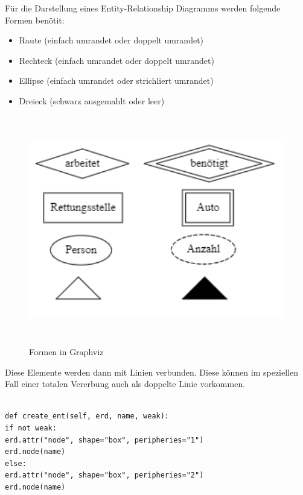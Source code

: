 \noindent
Für die Darstellung eines Entity-Relationship Diagramms werden folgende Formen benötit:
\begin{itemize}
	\item Raute (einfach umrandet oder doppelt umrandet)
	\item Rechteck (einfach umrandet oder doppelt umrandet)
	\item Ellipse (einfach umrandet oder strichliert umrandet)
	\item Dreieck (schwarz ausgemahlt oder leer)
\end{itemize}


\begin{figure}[H]
	\begin{center}
		\includegraphics[width=16cm,height=10cm]{images/graphviz_formen.png}
		\caption{Formen in Graphviz}
		\label{dot}
	\end{center}
\end{figure}
\fib{}
\noindent
Diese Elemente werden dann mit Linien verbunden. Diese können im speziellen Fall einer totalen Vererbung auch als doppelte Linie vorkommen.
\lstset{language=Python}
\lstset{frame=lines}
\lstset{basicstyle=\footnotesize}
\begin{lstlisting}

def create_ent(self, erd, name, weak):
if not weak:
erd.attr("node", shape="box", peripheries="1")
erd.node(name)
else:
erd.attr("node", shape="box", peripheries="2")
erd.node(name)

\end{lstlisting}
\noindent
